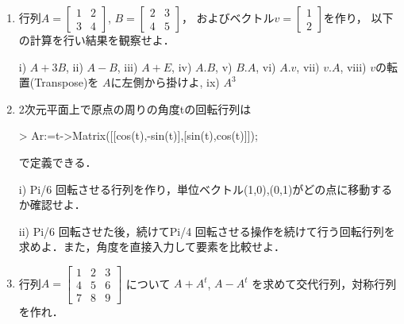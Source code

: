 \begin{enumerate}
\item 
行列$A= \left[ \begin {array}{cc} 1&2\\ 3&4\end {array} \right]$,
$B= \left[ \begin {array}{cc} 2&3\\ 4&5\end {array} \right]$，
およびベクトル$v= \left[ \begin {array}{c} 1\\ 2\end {array} \right] $を作り，
以下の計算を行い結果を観察せよ．

i) $A+3B$, 
ii) $A-B$, 
iii) $A+E$, 
iv) $A.B$, 
v) $B.A$, 
vi) $A.v$, 
vii) $v.A$,
viii) $v$の転置(Transpose)を
$A$に左側から掛けよ, 
ix) $A^3$

\item 2次元平面上で原点の周りの角度tの回転行列は
\begin{MapleInput}
> Ar:=t->Matrix([[cos(t),-sin(t)],[sin(t),cos(t)]]);
\end{MapleInput}
で定義できる．

i) Pi/6 回転させる行列を作り，単位ベクトル(1,0),(0,1)がどの点に移動するか確認せよ．

ii) Pi/6 回転させた後，続けてPi/4 回転させる操作を続けて行う回転行列を求めよ．また，角度を直接入力して要素を比較せよ．

\item
行列$A= \left[ \begin {array}{ccc} 1&2&3\\ 4&5&6\\ 7&8&9\end {array} \right]$
について
$A+A^t$, 
$A-A^t$
を求めて交代行列，対称行列を作れ．
\end{enumerate}
